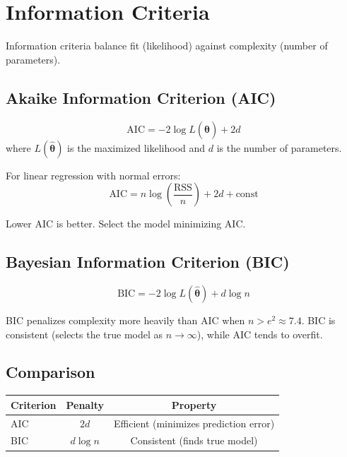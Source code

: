 \documentclass[main.tex]{subfiles}
\begin{document}
\needspace{0.33\textheight}
\section{Information Criteria}

Information criteria balance fit (likelihood) against complexity (number of parameters).

\subsection{Akaike Information Criterion (AIC)}

\begin{definition}[AIC]
$$\text{AIC} = -2\log L(\hat{\boldsymbol{\theta}}) + 2d$$
where $L(\hat{\boldsymbol{\theta}})$ is the maximized likelihood and $d$ is the number of parameters.
\end{definition}

For linear regression with normal errors:
$$\text{AIC} = n\log\left(\frac{\text{RSS}}{n}\right) + 2d + \text{const}$$

Lower AIC is better. Select the model minimizing AIC.

\subsection{Bayesian Information Criterion (BIC)}

\begin{definition}[BIC]
$$\text{BIC} = -2\log L(\hat{\boldsymbol{\theta}}) + d\log n$$
\end{definition}

BIC penalizes complexity more heavily than AIC when $n > e^2 \approx 7.4$. BIC is consistent (selects the true model as $n \to \infty$), while AIC tends to overfit.

\subsection{Comparison}

\begin{center}
\begin{tabular}{lcc}
\hline
\textbf{Criterion} & \textbf{Penalty} & \textbf{Property} \\
\hline
AIC & $2d$ & Efficient (minimizes prediction error) \\
BIC & $d\log n$ & Consistent (finds true model) \\
\hline
\end{tabular}
\end{center}
\end{document}
